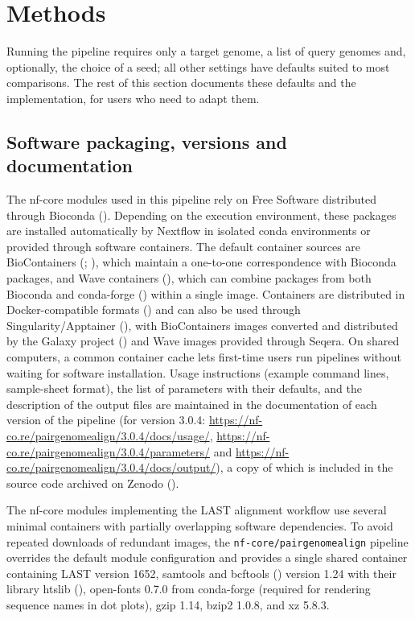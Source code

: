 \documentclass[PCJ,Unicode,screen]{cedram}
\begin{document}
\section*{Methods}

Running the pipeline requires only a target genome, a list of query genomes and, optionally, the choice of a seed; all other settings have defaults suited to most comparisons. The rest of this section documents these defaults and the implementation, for users who need to adapt them.

\subsection*{Software packaging, versions and documentation}

The nf-core modules used in this pipeline rely on Free Software distributed through Bioconda (\cite{Gruening_2018}). Depending on the execution environment, these packages are installed automatically by Nextflow in isolated conda environments or provided through software containers. The default container sources are BioContainers (\cite{Leprevost_2017}; \cite{Bai_2021}), which maintain a one-to-one correspondence with Bioconda packages, and Wave containers (\cite{seqera_wave}), which can combine packages from both Bioconda and conda-forge (\cite{conda_forge_zenodo}) within a single image. Containers are distributed in Docker-compatible formats (\cite{DiTommaso_2015}) and can also be used through Singularity/Apptainer (\cite{Kurtzer_2017}), with BioContainers images converted and distributed by the Galaxy project (\cite{Afgan_2016}) and Wave images provided through Seqera. On shared computers, a common container cache lets first-time users run pipelines without waiting for software installation. Usage instructions (example command lines, sample-sheet format), the list of parameters with their defaults, and the description of the output files are maintained in the documentation of each version of the pipeline (for version 3.0.4: \url{https://nf-co.re/pairgenomealign/3.0.4/docs/usage/}, \url{https://nf-co.re/pairgenomealign/3.0.4/parameters/} and \url{https://nf-co.re/pairgenomealign/3.0.4/docs/output/}), a copy of which is included in the source code archived on Zenodo (\cite{pairgenomealign}).

The nf-core modules implementing the LAST alignment workflow use several minimal containers with partially overlapping software dependencies. To avoid repeated downloads of redundant images, the \texttt{nf-core/pairgenomealign} pipeline overrides the default module configuration and provides a single shared container containing LAST version 1652, samtools and bcftools (\cite{Danecek_2021}) version 1.24 with their library htslib (\cite{Bonfield_2021}), open-fonts 0.7.0 from conda-forge (required for rendering sequence names in dot plots), gzip 1.14, bzip2 1.0.8, and xz 5.8.3.
\end{document}
